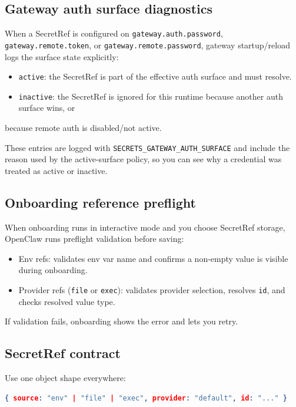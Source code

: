 \subsection{Gateway auth surface diagnostics}


When a SecretRef is configured on \texttt{gateway.auth.password}, \texttt{gateway.remote.token}, or
\texttt{gateway.remote.password}, gateway startup/reload logs the surface state explicitly:

\begin{itemize}
  \item \texttt{active}: the SecretRef is part of the effective auth surface and must resolve.
  \item \texttt{inactive}: the SecretRef is ignored for this runtime because another auth surface wins, or
\end{itemize}

because remote auth is disabled/not active.

These entries are logged with \texttt{SECRETS\_GATEWAY\_AUTH\_SURFACE} and include the reason used by the
active-surface policy, so you can see why a credential was treated as active or inactive.

\subsection{Onboarding reference preflight}


When onboarding runs in interactive mode and you choose SecretRef storage, OpenClaw runs preflight validation before saving:

\begin{itemize}
  \item Env refs: validates env var name and confirms a non-empty value is visible during onboarding.
  \item Provider refs (\texttt{file} or \texttt{exec}): validates provider selection, resolves \texttt{id}, and checks resolved value type.
\end{itemize}


If validation fails, onboarding shows the error and lets you retry.

\subsection{SecretRef contract}


Use one object shape everywhere:

\begin{lstlisting}[language=json]
{ source: "env" | "file" | "exec", provider: "default", id: "..." }
\end{lstlisting}


